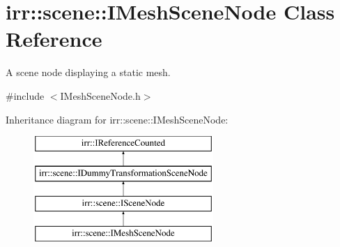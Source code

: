 \hypertarget{classirr_1_1scene_1_1IMeshSceneNode}{}\section{irr\+:\+:scene\+:\+:I\+Mesh\+Scene\+Node Class Reference}
\label{classirr_1_1scene_1_1IMeshSceneNode}


A scene node displaying a static mesh.  




{\ttfamily \#include $<$I\+Mesh\+Scene\+Node.\+h$>$}

Inheritance diagram for irr\+:\+:scene\+:\+:I\+Mesh\+Scene\+Node\+:\begin{figure}[H]
\begin{center}
\leavevmode
\includegraphics[height=4.000000cm]{classirr_1_1scene_1_1IMeshSceneNode}
\end{center}
\end{figure}
